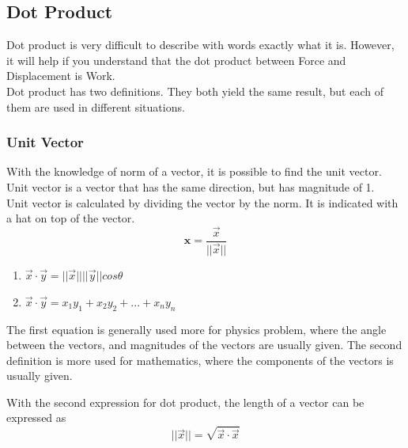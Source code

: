 \documentclass[12pt]{article}
\newcommand{\uvec}[1]{\boldsymbol{\hat{\textbf{#1}}}}
\begin{document}
\subsection{Dot Product}
Dot product is very difficult to describe with words exactly what it is. However, it will help if you understand that the dot product between Force and Displacement is Work.\\
Dot product has two definitions. They both yield the same result, but each of them are used in different situations.\\
\subsubsection{Unit Vector}
With the knowledge of norm of a vector, it is possible to find the unit vector. Unit vector is a vector that has the same direction, but has magnitude of 1.\\
Unit vector is calculated by dividing the vector by the norm. It is indicated with a hat on top of the vector.\\
\begin{equation}
\uvec{x} = \frac{\vec{x}}{||\vec{x}||}
\end{equation}

\begin{enumerate}
  \item $\vec{x}\cdot\vec{y} = ||\vec{x}|| ||\vec{y}|| cos\theta$
  \item $\vec{x}\cdot\vec{y} = x_1y_1 + x_2y_2 + ... +x_ny_n$
\end{enumerate}
The first equation is generally used more for physics problem, where the angle between the vectors, and magnitudes of the vectors are usually given. The second definition is more used for mathematics, where the components of the vectors is usually given.

With the second expression for dot product, the length of a vector can be expressed as 
\begin{equation}
||\vec{x}|| = \sqrt{\vec{x}\cdot\vec{x}}
\end{equation}
\end{document}
